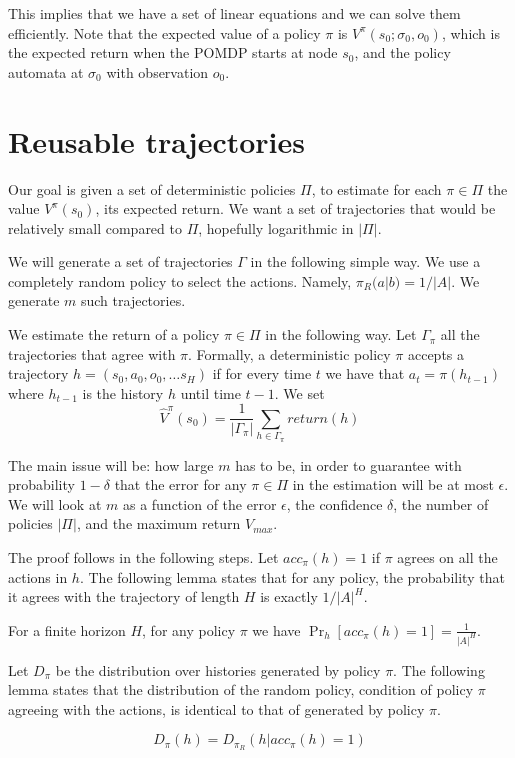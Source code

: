 This implies that we have a set of linear equations and we can solve them efficiently. Note that the expected value of a policy $\pi$ is $V^\pi(s_0;\sigma_0,o_0)$, which is the expected return when the POMDP starts at node $s_0$, and the policy automata at $\sigma_0$ with observation $o_0$.


\section{Reusable trajectories}

Our goal is given a set of deterministic policies $\Pi$, to estimate
for each $\pi\in \Pi$ the value $V^\pi(s_0)$, its expected return.
We want a set of trajectories that would be relatively small
compared to $\Pi$, hopefully logarithmic in $|\Pi|$.

We will generate a set of trajectories $\Gamma$ in the following
simple way. We use a completely random policy to select the actions.
Namely, $\pi_R(a|b)=1/|A|$. We generate $m$ such trajectories.

We estimate the return of a policy $\pi\in \Pi$ in the following way. Let $\Gamma_\pi$ all the trajectories that agree with $\pi$. Formally, a deterministic policy $\pi$ accepts a trajectory $h=(s_0,a_0,o_0, \ldots s_H)$ if for every time $t$ we have that $a_t=\pi(h_{t-1})$ where $h_{t-1}$ is the history $h$ until time $t-1$.
We set
\[
\hat{V}^\pi(s_0)=\frac{1}{|\Gamma_\pi|}\sum_{h\in \Gamma_\pi}
return(h)
\]

The main issue will be: how large $m$ has to be, in order to
guarantee with probability $1-\delta$ that the error for any $\pi\in
\Pi$ in the estimation will be at most $\epsilon$. We will look at
$m$ as a function of the error $\epsilon$, the confidence $\delta$,
the number of policies $|\Pi|$, and the maximum return $V_{max}$.

The proof follows in the following steps. Let $acc_\pi(h)=1$ if
$\pi$ agrees on all the actions in $h$. The following lemma states
that for any policy, the probability that it agrees with the
trajectory of length $H$ is exactly $1/|A|^H$.
\begin{lemma}
For a finite horizon $H$, for any policy $\pi$ we have
$\Pr_h[acc_\pi(h)=1]=\frac{1}{|A|^H}$.
\end{lemma}

Let $D_\pi$ be the distribution over histories generated by policy
$\pi$. The following lemma states that the distribution of the
random policy, condition of policy $\pi$ agreeing with the actions,
is identical to that of generated by policy $\pi$.
\begin{lemma}
\[
D_\pi(h)=D_{\pi_R}(h|acc_\pi(h)=1)
\]
\end{lemma}

